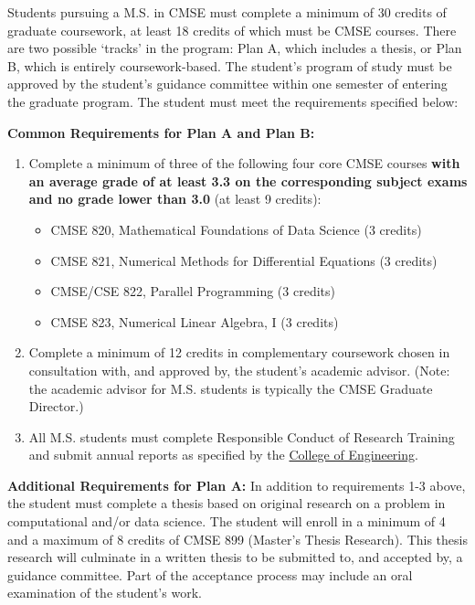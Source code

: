 Students pursuing a M.S. in CMSE must complete a minimum of 30 credits
of graduate coursework, at least 18 credits of which must be CMSE
courses. There are two possible `tracks' in the program: Plan A, which
includes a thesis, or Plan B, which is entirely coursework-based. The
student's program of study must be approved by the student's guidance
committee within one semester of entering the graduate program. The
student must meet the requirements specified below:

\vspace{3mm}
\noindent
\textbf{Common Requirements for Plan A and Plan B:}

\begin{enumerate}

\item Complete a minimum of three of the following four core CMSE
  courses \textbf{with an average grade of at least 3.3 on the
    corresponding subject exams and no grade lower than 3.0} (at least
  9 credits):

\begin{itemize}
    \item  CMSE 820, Mathematical Foundations of Data Science (3 credits)  
    \item  CMSE 821, Numerical Methods for Differential Equations (3 credits)  
    \item  CMSE/CSE 822, Parallel Programming (3 credits)  
    \item  CMSE 823, Numerical Linear Algebra, I (3 credits)  
\end{itemize}

\item Complete a minimum of 12 credits in complementary coursework
  chosen in consultation with, and approved by, the student's academic
  advisor.  (Note: the academic advisor for M.S. students is typically the CMSE Graduate Director.)
 
\item All M.S. students must complete Responsible Conduct of Research
  Training and submit annual reports as specified by the
  \href{https://www.egr.msu.edu/academics/graduate/rcr}{College of
    Engineering}.

\end{enumerate}

\vspace{3mm}
\noindent
\textbf{Additional Requirements for Plan A:} In addition to
requirements 1-3 above, the student must complete a thesis based on
original research on a problem in computational and/or data
science. The student will enroll in a minimum of 4 and a maximum of 8
credits of CMSE 899 (Master's Thesis Research). This thesis research
will culminate in a written thesis to be submitted to, and accepted
by, a guidance committee. Part of the acceptance process may include
an oral examination of the student's work.

